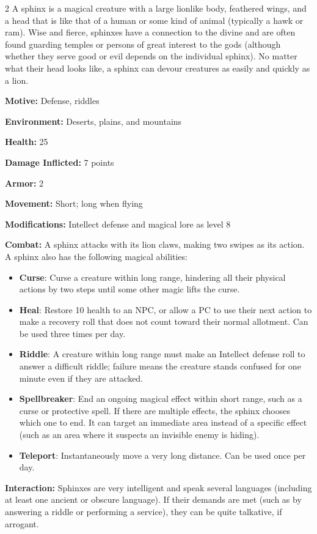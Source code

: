 \begin{multicols}{2}
A sphinx is a magical creature with a large lionlike body, feathered wings, and a head that is like that of a human or some kind of animal (typically a hawk or ram). Wise and fierce, sphinxes have a connection to the divine and are often found guarding temples or persons of great interest to the gods (although whether they serve good or evil depends on the individual sphinx). No matter what their head looks like, a sphinx can devour creatures as easily and quickly as a lion. 

\textbf{Motive:} Defense, riddles 

\textbf{Environment:} Deserts, plains, and mountains 

\textbf{Health:} 25 

\textbf{Damage Inflicted:} 7 points 

\textbf{Armor:} 2 

\textbf{Movement:} Short; long when flying 

\textbf{Modifications:} Intellect defense and magical lore as level 8 

\textbf{Combat:} A sphinx attacks with its lion claws, making two swipes as its action. A sphinx also has the following magical abilities: 

\begin{itemize}
\item \textbf{Curse}: Curse a creature within long range, hindering all their physical actions by two steps until some other magic lifts the curse. 
\item \textbf{Heal}: Restore 10 health to an NPC, or allow a PC to use their next action to make a recovery roll that does not count toward their normal allotment. Can be used three times per day. 
\item \textbf{Riddle}: A creature within long range must make an Intellect defense roll to answer a difficult riddle; failure means the creature stands confused for one minute even if they are attacked. 
\item \textbf{Spellbreaker}: End an ongoing magical effect within short range, such as a curse or protective spell. If there are multiple effects, the sphinx chooses which one to end. It can target an immediate area instead of a specific effect (such as an area where it suspects an invisible enemy is hiding). 
\item \textbf{Teleport}: Instantaneously move a very long distance. Can be used once per day. 
\end{itemize}

\textbf{Interaction:} Sphinxes are very intelligent and speak several languages (including at least one ancient or obscure language). If their demands are met (such as by answering a riddle or performing a service), they can be quite talkative, if arrogant. 


\end{multicols}
